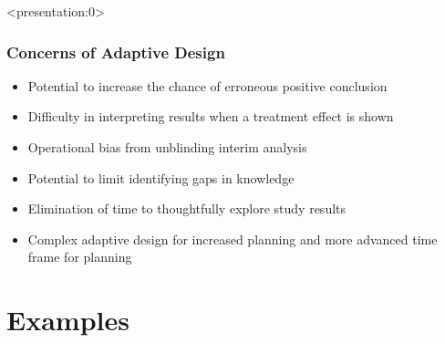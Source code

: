\documentclass{beamer}
\begin{document}
\begin{frame}<presentation:0>
	\frametitle{Concerns of Adaptive Design}
  \begin{itemize}
	\item Potential to increase the chance of erroneous positive conclusion
	\item Difficulty in interpreting results when a treatment effect is shown
	\item Operational bias from unblinding interim analysis
	\item Potential to limit identifying gaps in knowledge
	\item Elimination of time to thoughtfully explore study results
	\item Complex adaptive design for increased planning and more advanced time frame for planning
  \end{itemize}
\end{frame}
\addtocounter{framenumber}{-1}


\section{Examples}
\end{document}
